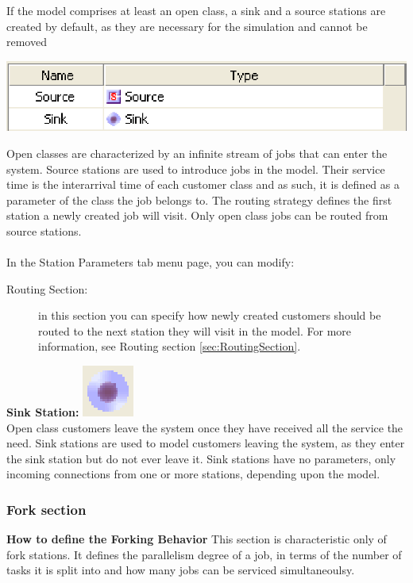 \begin{enumerate*}
If the model comprises at least an open class, a sink and  a source stations are created by default, as they are necessary for the simulation and cannot be removed\\
\begin{center}
\includegraphics[scale=.5]{img/jsim/source_sink.eps}
\end{center}
Open classes are characterized by an infinite stream of jobs that can enter the system. Source stations are used to introduce jobs in the model. Their service time is the interarrival time of each customer class and as such, it is defined as a parameter of the class the job belongs to. The routing strategy defines the first station 
a newly created job will visit. Only open class jobs can be routed from source stations.\\\\
In the Station Parameters tab menu page, you can modify:
\begin{description}
\item[Routing Section:] in this section you can specify how newly created customers should be routed to the next station they will visit in the model.
For more information, see Routing section \ref{sec:RoutingSection}.
\end{description}
\item \textbf{Sink Station:} \includegraphics[scale=1]{img/jsim/sink.eps}\\
Open class customers leave the system once they have received all the service the need. Sink stations are used to model customers leaving the system, as they 
enter the sink station but do not ever leave it. Sink stations have no parameters, only incoming connections from one or more stations, depending upon the model.
\end{enumerate*}

\subsubsection{Fork section}
\label{sec:ForkSection}
\textbf{How to define the Forking Behavior}
This section is characteristic only of fork stations. It defines the parallelism degree of a job, in terms of the number of tasks it is split into and how many jobs can be serviced simultaneoulsy.

